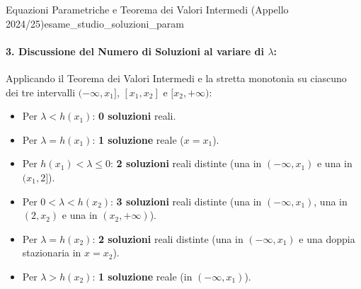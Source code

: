 \begin{esempio}{Equazioni Parametriche e Teorema dei Valori Intermedi (Appello 2024/25)}{esame_studio_soluzioni_param}
\paragraph{3. Discussione del Numero di Soluzioni al variare di $\lambda$:}
Applicando il Teorema dei Valori Intermedi e la stretta monotonia su ciascuno dei tre intervalli $(-\infty, x_1]$, $[x_1, x_2]$ e $[x_2, +\infty)$:
\begin{itemize}
    \item Per $\lambda < h(x_1)$: \textbf{0 soluzioni} reali.
    \item Per $\lambda = h(x_1)$: \textbf{1 soluzione} reale ($x = x_1$).
    \item Per $h(x_1) < \lambda \le 0$: \textbf{2 soluzioni} reali distinte (una in $(-\infty, x_1)$ e una in $(x_1, 2]$).
    \item Per $0 < \lambda < h(x_2)$: \textbf{3 soluzioni} reali distinte (una in $(-\infty, x_1)$, una in $(2, x_2)$ e una in $(x_2, +\infty)$).
    \item Per $\lambda = h(x_2)$: \textbf{2 soluzioni} reali distinte (una in $(-\infty, x_1)$ e una doppia stazionaria in $x = x_2$).
    \item Per $\lambda > h(x_2)$: \textbf{1 soluzione} reale (in $(-\infty, x_1)$).
\end{itemize}
\end{esempio}

